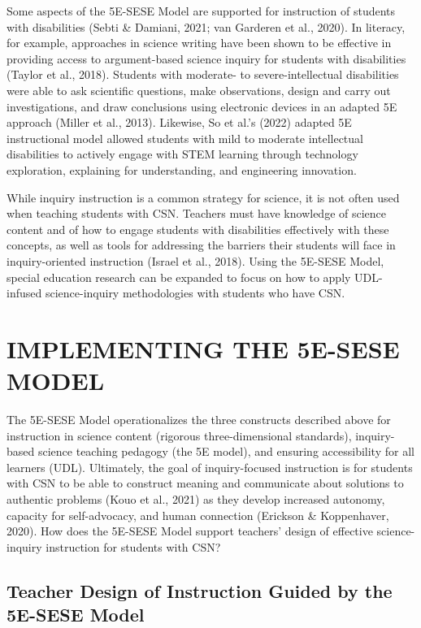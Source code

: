 \documentclass[11.5pt]{sig-alternate} %
\begin{document}
\begin{large}
Some aspects of the 5E-SESE Model are supported for instruction of students with disabilities (Sebti \& Damiani, 2021; van Garderen et al., 2020). In literacy, for example, approaches in science writing have been shown to be effective in providing access to argument-based science inquiry for students with disabilities (Taylor et al., 2018). Students with moderate- to severe-intellectual disabilities were able to ask scientific questions, make observations, design and carry out investigations, and draw conclusions using electronic devices in an adapted 5E approach (Miller et al., 2013). Likewise, So et al.’s (2022) adapted 5E instructional model allowed students with mild to moderate intellectual disabilities to actively engage with STEM learning through technology exploration, explaining for understanding, and engineering innovation.

While inquiry instruction is a common strategy for science, it is not often used when teaching students with CSN. Teachers must have knowledge of science content and of how to engage students with disabilities effectively with these concepts, as well as tools for addressing the barriers their students will face in inquiry-oriented instruction (Israel et al., 2018). Using the 5E-SESE Model, special education research can be expanded to focus on how to apply UDL-infused science-inquiry methodologies with students who have CSN.

\section*{IMPLEMENTING THE 5E-SESE MODEL}

The 5E-SESE Model operationalizes the three constructs described above for instruction in science content (rigorous three-dimensional standards), inquiry-based science teaching pedagogy (the 5E model), and ensuring accessibility for all learners (UDL). Ultimately, the goal of inquiry-focused instruction is for students with CSN to be able to construct meaning and communicate about solutions to authentic problems (Kouo et al., 2021) as they develop increased autonomy, capacity for self-advocacy, and human connection (Erickson \& Koppenhaver, 2020). How does the 5E-SESE Model support teachers’ design of effective science-inquiry instruction for students with CSN?

\subsection*{Teacher Design of Instruction Guided by the 5E-SESE Model}


\end{large}
\end{document}
